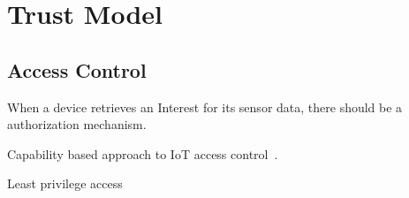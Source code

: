 \section{Trust Model}

\subsection{Access Control}\label{access_control}

When a device retrieves an Interest for its sensor data, there should be a authorization mechanism. 

Capability based approach to \gls{IoT} access control~\cite{DBLP:conf/imis/GusmeroliPR12}.

Least privilege access
